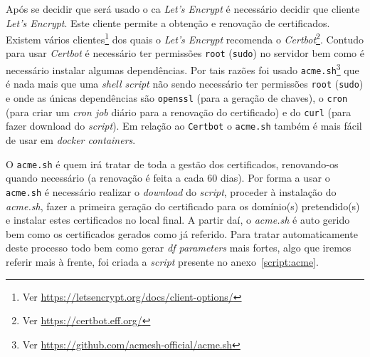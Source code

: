 Após se decidir que será usado o \acrshort{ca} \textit{Let's Encrypt} é necessário decidir que cliente \textit{Let's Encrypt}. Este cliente permite a obtenção e renovação de certificados. Existem vários clientes\footnote{Ver \url{https://letsencrypt.org/docs/client-options/}} dos quais o \textit{Let's Encrypt} recomenda o \textit{Certbot}\footnote{Ver \url{https://certbot.eff.org/}}. Contudo para usar \textit{Certbot} é necessário ter permissões \texttt{root} (\texttt{sudo}) no servidor bem como é necessário instalar algumas dependências. Por tais razões foi usado \texttt{acme.sh}\footnote{Ver \url{https://github.com/acmesh-official/acme.sh}} que é nada mais que uma \textit{shell script} não sendo necessário ter permissões \texttt{root} (\texttt{sudo}) e onde as únicas dependências são \texttt{openssl} (para a geração de chaves), o \texttt{cron} (para criar um \textit{cron job} diário para a renovação do certificado) e do \texttt{curl} (para fazer download do \textit{script}). Em relação ao \texttt{Certbot} o \texttt{acme.sh} também é mais fácil de usar em \textit{docker containers}.

O \texttt{acme.sh} é quem irá tratar de toda a gestão dos certificados, renovando-os quando necessário (a renovação é feita a cada 60 dias).
Por forma a usar o \texttt{acme.sh} é necessário realizar o \textit{download} do \textit{script}, proceder à instalação do \textit{acme.sh}, fazer a primeira geração do certificado para os domínio(s) pretendido(s) e instalar estes certificados no local final. A partir daí, o \textit{acme.sh} é auto gerido bem como os certificados gerados como já referido. Para tratar automaticamente deste processo todo bem como gerar \textit{\acrshort{df} parameters} mais fortes, algo que iremos referir mais à frente, foi criada a \textit{script} presente no anexo~\ref{script:acme}.
